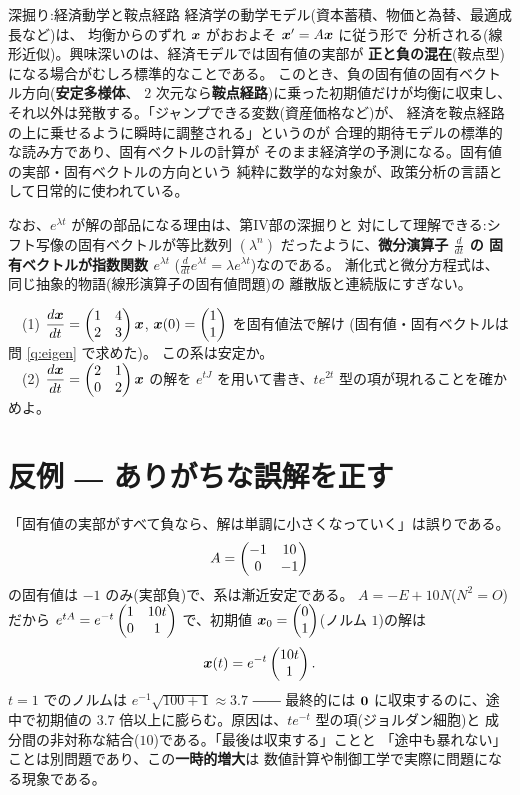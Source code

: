 \begin{itembox}[l]{深掘り:経済動学と鞍点経路}
経済学の動学モデル(資本蓄積、物価と為替、最適成長など)は、
均衡からのずれ $\bm{x}$ がおおよそ $\bm{x}' = A\bm{x}$ に従う形で
分析される(線形近似)。興味深いのは、経済モデルでは固有値の実部が
\textbf{正と負の混在}(鞍点型)になる場合がむしろ標準的なことである。
このとき、負の固有値の固有ベクトル方向(\textbf{安定多様体}、
$2$ 次元なら\textbf{鞍点経路})に乗った初期値だけが均衡に収束し、
それ以外は発散する。「ジャンプできる変数(資産価格など)が、
経済を鞍点経路の上に乗せるように瞬時に調整される」というのが
合理的期待モデルの標準的な読み方であり、固有ベクトルの計算が
そのまま経済学の予測になる。固有値の実部・固有ベクトルの方向という
純粋に数学的な対象が、政策分析の言語として日常的に使われている。

なお、$e^{\lambda t}$ が解の部品になる理由は、第IV部の深掘りと
対にして理解できる:シフト写像の固有ベクトルが等比数列
$(\lambda^n)$ だったように、\textbf{微分演算子 $\frac{d}{dt}$ の
固有ベクトルが指数関数 $e^{\lambda t}$}
($\frac{d}{dt}e^{\lambda t} = \lambda e^{\lambda t}$)なのである。
漸化式と微分方程式は、同じ抽象的物語(線形演算子の固有値問題)の
離散版と連続版にすぎない。
\end{itembox}

\begin{mondai}\label{q:ode}
　(1) $\dfrac{d\bm{x}}{dt} = \begin{pmatrix}1 & 4 \\ 2 & 3\end{pmatrix}\bm{x}$,
$\bm{x}(0) = \begin{pmatrix}1 \\ 1\end{pmatrix}$ を固有値法で解け
(固有値・固有ベクトルは問 \ref{q:eigen} で求めた)。
この系は安定か。\\
　(2) $\dfrac{d\bm{x}}{dt} = \begin{pmatrix}2 & 1 \\ 0 & 2\end{pmatrix}\bm{x}$ の解を
$e^{tJ}$ を用いて書き、$te^{2t}$ 型の項が現れることを確かめよ。
\end{mondai}

\section{反例 ― ありがちな誤解を正す}

\begin{hanrei}\label{hanrei:ode-transient}
「固有値の実部がすべて負なら、解は単調に小さくなっていく」は誤りである。
\[
A = \begin{pmatrix}-1 & 10 \\ 0 & -1\end{pmatrix}
\]
の固有値は $-1$ のみ(実部負)で、系は漸近安定である。
$A = -E + 10N$($N^2 = O$)だから
$e^{tA} = e^{-t}\begin{pmatrix}1 & 10t \\ 0 & 1\end{pmatrix}$ で、初期値
$\bm{x}_0 = \begin{pmatrix}0 \\ 1\end{pmatrix}$(ノルム $1$)の解は
\[
\bm{x}(t) = e^{-t}\begin{pmatrix}10t \\ 1\end{pmatrix}.
\]
$t = 1$ でのノルムは $e^{-1}\sqrt{100 + 1} \approx 3.7$ ――
最終的には $\bm{0}$ に収束するのに、途中で初期値の
$3.7$ 倍以上に膨らむ。原因は、$te^{-t}$ 型の項(ジョルダン細胞)と
成分間の非対称な結合($10$)である。「最後は収束する」ことと
「途中も暴れない」ことは別問題であり、この\textbf{一時的増大}は
数値計算や制御工学で実際に問題になる現象である。
\end{hanrei}

